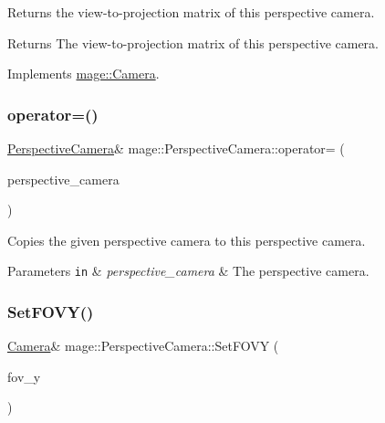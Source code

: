 Returns the view-\/to-\/projection matrix of this perspective camera.

\begin{DoxyReturn}{Returns}
The view-\/to-\/projection matrix of this perspective camera. 
\end{DoxyReturn}


Implements \hyperlink{classmage_1_1_camera_a1f5206864cf18b5548219492556df5d2}{mage\+::\+Camera}.

\hypertarget{classmage_1_1_perspective_camera_ac4c9ab3a10fac363e6779570c4905d65}{}\label{classmage_1_1_perspective_camera_ac4c9ab3a10fac363e6779570c4905d65} 
\subsubsection{\texorpdfstring{operator=()}{operator=()}}
{\footnotesize\ttfamily \hyperlink{classmage_1_1_perspective_camera}{Perspective\+Camera}\& mage\+::\+Perspective\+Camera\+::operator= (\begin{DoxyParamCaption}\item[{const \hyperlink{classmage_1_1_perspective_camera}{Perspective\+Camera} \&}]{perspective\+\_\+camera }\end{DoxyParamCaption})}

Copies the given perspective camera to this perspective camera.


\begin{DoxyParams}[1]{Parameters}
\mbox{\tt in}  & {\em perspective\+\_\+camera} & The perspective camera. \\
\hline
\end{DoxyParams}
\hypertarget{classmage_1_1_perspective_camera_a00033fc6b25206c40a056ce142fecfee}{}\label{classmage_1_1_perspective_camera_a00033fc6b25206c40a056ce142fecfee} 
\subsubsection{\texorpdfstring{Set\+F\+O\+V\+Y()}{SetFOVY()}}
{\footnotesize\ttfamily \hyperlink{classmage_1_1_camera}{Camera}\& mage\+::\+Perspective\+Camera\+::\+Set\+F\+O\+VY (\begin{DoxyParamCaption}\item[{float}]{fov\+\_\+y }\end{DoxyParamCaption})}

